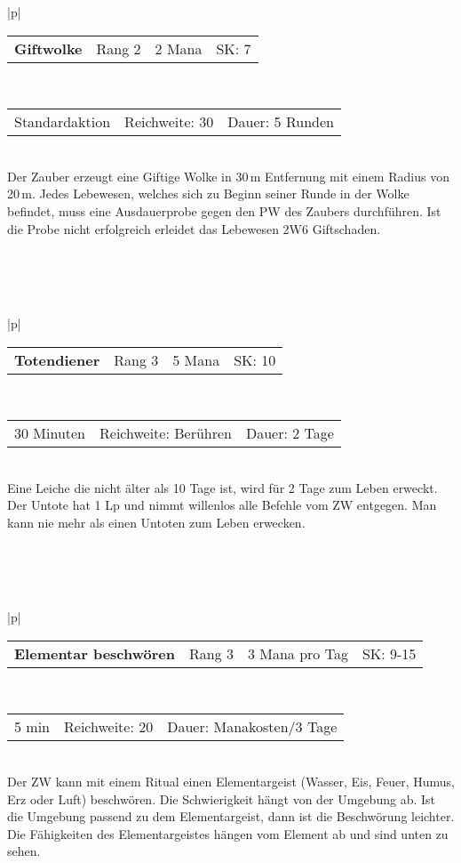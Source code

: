 \documentclass[../../Heldenanleitung2]{subfiles}
\begin{document}
\begin{tabular}{|p{\textwidth}|}
\hline
\begin{tabularx}{\textwidth}{X|X|X|X}
\textbf{Giftwolke} & Rang 2 & 2 Mana & SK: 7
\end{tabularx} \\ \hline
\begin{tabularx}{\textwidth}{X|X|X}
Standardaktion & Reichweite: 30 & Dauer: 5 Runden
\end{tabularx} \\ \hline
Der Zauber erzeugt eine Giftige Wolke in 30\,m Entfernung mit einem Radius von 20\,m. Jedes Lebewesen, welches sich zu Beginn seiner Runde in der Wolke befindet, muss eine Ausdauerprobe gegen den PW des Zaubers durchführen. Ist die Probe nicht erfolgreich erleidet das Lebewesen 2W6 Giftschaden.
\\ \hline
\end{tabular}
\\\\\\
\begin{tabular}{|p{\textwidth}|}
\hline
\begin{tabularx}{\textwidth}{X|X|X|X}
\textbf{Totendiener} & Rang 3 & 5 Mana & SK: 10
\end{tabularx} \\ \hline
\begin{tabularx}{\textwidth}{X|X|X}
30 Minuten & Reichweite: Berühren & Dauer: 2 Tage
\end{tabularx} \\ \hline
Eine Leiche die nicht älter als 10 Tage ist, wird für 2 Tage zum Leben erweckt. Der Untote hat 1 Lp und nimmt willenlos alle Befehle vom ZW entgegen.
Man kann nie mehr als einen Untoten zum Leben erwecken.
\\ \hline
\end{tabular}
\\\\\\
\begin{tabular}{|p{\textwidth}|}
\hline
\begin{tabularx}{\textwidth}{X|X|X|X}
\textbf{Elementar beschwören} & Rang 3 & 3 Mana pro Tag & SK: 9-15
\end{tabularx} \\ \hline
\begin{tabularx}{\textwidth}{X|X|X}
5 min & Reichweite: 20 & Dauer: Manakosten/3 Tage
\end{tabularx} \\ \hline
Der ZW kann mit einem Ritual einen Elementargeist (Wasser, Eis, Feuer, Humus, Erz oder Luft) beschwören. Die Schwierigkeit hängt von der Umgebung ab. Ist die Umgebung passend zu dem Elementargeist, dann ist die Beschwörung leichter. Die Fähigkeiten des Elementargeistes hängen vom Element ab und sind unten zu sehen.
\\ \hline
\end{tabular}
\end{document}
